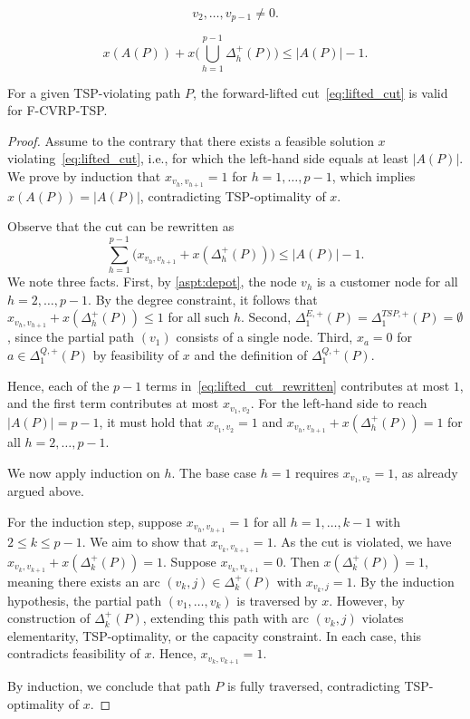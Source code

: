 \documentclass[10pt,a4paper]{amsart}
\begin{document}
\begin{equation}
    v_2, \ldots, v_{p-1} \neq 0. \label{aspt:depot}
\end{equation}

\begin{equation}
x(A(P))+ x\!\big(\bigcup_{h=1}^{p-1} \Delta^{+}_{h}(P)\big)\leq |A(P)|-1. \label{eq:lifted_cut}
\end{equation}

\begin{prop}
For a given TSP-violating path $P$, the forward-lifted cut~\eqref{eq:lifted_cut} is valid for F-CVRP-TSP.
\end{prop}

\begin{proof}
Assume to the contrary that there exists a feasible solution $x$ violating~\eqref{eq:lifted_cut}, i.e., for which the left-hand side equals at least $|A(P)|$. We prove by induction that $x_{v_h, v_{h+1}} = 1$ for $h = 1, \ldots, p-1$, which implies $x(A(P)) = |A(P)|$, contradicting TSP-optimality of $x$.

Observe that the cut can be rewritten as
\begin{equation}
\sum_{h=1}^{p-1} \big( x_{v_h, v_{h+1}} + x(\Delta^{+}_{h}(P)) \big) \leq |A(P)| - 1. \label{eq:lifted_cut_rewritten}
\end{equation}
We note three facts. First, by \eqref{aspt:depot}, the node $v_h$ is a customer node for all $h = 2, \ldots, p-1$. By the degree constraint, it follows that $x_{v_h, v_{h+1}} + x(\Delta^{+}_{h}(P)) \leq 1$ for all such $h$. Second, $\Delta^{E,+}_{1}(P) = \Delta^{TSP,+}_{1}(P) = \emptyset$, since the partial path $(v_1)$ consists of a single node. Third, $x_a=0$ for $a\in \Delta^{Q,+}_{1}(P)$ by feasibility of $x$ and the definition of $\Delta^{Q,+}_{1}(P)$.

Hence, each of the $p-1$ terms in~\eqref{eq:lifted_cut_rewritten} contributes at most $1$, and the first term contributes at most $x_{v_1, v_2}$. For the left-hand side to reach $|A(P)| = p - 1$, it must hold that $x_{v_1, v_2} = 1$ and $x_{v_h, v_{h+1}} + x(\Delta^{+}_{h}(P)) = 1$ for all $h = 2, \ldots, p-1$.

We now apply induction on $h$. The base case $h=1$ requires $x_{v_1, v_2} = 1$, as already argued above.

For the induction step, suppose $x_{v_h, v_{h+1}} = 1$ for all $h = 1, \ldots, k-1$ with $2 \leq k \leq p-1$. We aim to show that $x_{v_k, v_{k+1}} = 1$. As the cut is violated, we have $x_{v_k, v_{k+1}} + x(\Delta^{+}_{k}(P)) = 1$. Suppose $x_{v_k, v_{k+1}} = 0$. Then $x(\Delta^{+}_{k}(P)) = 1$, meaning there exists an arc $(v_k, j) \in \Delta^{+}_{k}(P)$ with $x_{v_k, j} = 1$. By the induction hypothesis, the partial path $(v_1, \ldots, v_k)$ is traversed by $x$. However, by construction of $\Delta^{+}_{k}(P)$, extending this path with arc $(v_k, j)$ violates elementarity, TSP-optimality, or the capacity constraint. In each case, this contradicts feasibility of $x$. Hence, $x_{v_k, v_{k+1}} = 1$.

By induction, we conclude that path $P$ is fully traversed, contradicting TSP-optimality of $x$.
\end{proof}
\end{document}
